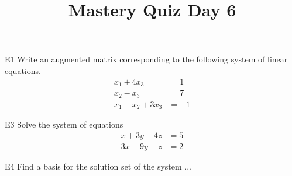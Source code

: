 \documentclass{sbgLAquiz}
\title{Mastery Quiz Day 6 }
\begin{document}
\begin{problem}{E1}
Write an augmented matrix corresponding to the following system of linear equations.
\begin{align*}
x_1+4x_3 &= 1 \\
x_2-x_3 &= 7 \\
x_1-x_2+3x_3 &= -1
\end{align*}
\end{problem}

\begin{problem}{E3}
Solve the system of equations
\begin{align*}
x+3y-4z &= 5 \\
3x+9y+z &= 2
\end{align*}
\end{problem}
\newpage

\begin{problem}{E4}
Find a basis for the solution set of the system ...
\end{problem}
\end{document}

